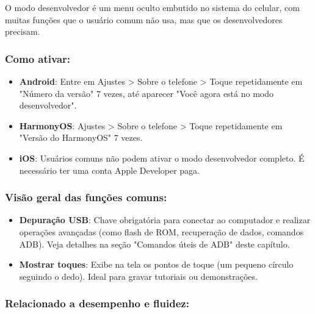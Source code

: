 


O modo desenvolvedor é um menu oculto embutido no sistema do celular, com muitas funções que o usuário comum não usa, mas que os desenvolvedores precisam.

\subsubsection*{Como ativar:}

\begin{itemize}
  \item \textbf{Android}: Entre em Ajustes > Sobre o telefone > Toque repetidamente em "Número da versão" 7 vezes, até aparecer "Você agora está no modo desenvolvedor".
  \item \textbf{HarmonyOS}: Ajustes > Sobre o telefone > Toque repetidamente em "Versão do HarmonyOS" 7 vezes.
  \item \textbf{iOS}: Usuários comuns não podem ativar o modo desenvolvedor completo. É necessário ter uma conta Apple Developer paga.
\end{itemize}

\subsubsection*{Visão geral das funções comuns:}

\begin{itemize}
  \item \textbf{Depuração USB}: Chave obrigatória para conectar ao computador e realizar operações avançadas (como flash de ROM, recuperação de dados, comandos ADB). Veja detalhes na seção "Comandos úteis de ADB" deste capítulo.
  \item \textbf{Mostrar toques}: Exibe na tela os pontos de toque (um pequeno círculo seguindo o dedo). Ideal para gravar tutoriais ou demonstrações.
\end{itemize}

\subsubsection*{Relacionado a desempenho e fluidez:}

